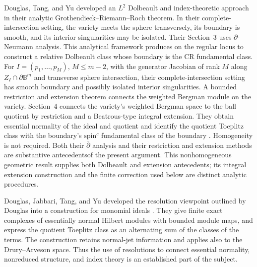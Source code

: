 \documentclass[11pt,reqno]{amsart}
\theoremstyle{remark}
\newcommand{\dbar}{\bar\partial}
\begin{document}
Douglas, Tang, and Yu developed an $L^2$ Dolbeault and index-theoretic
approach in their analytic Grothendieck--Riemann--Roch theorem. In their complete-intersection setting, the
variety meets the sphere transversely, its boundary is smooth, and
its interior singularities may be isolated. Their Section~3 uses $\dbar$-Neumann
analysis.
This analytical framework produces on the regular locus to construct a relative Dolbeault
class whose
boundary is the CR fundamental class. For $I=(p_1,\ldots,p_M)$,
$M\le m-2$, with the generator Jacobian of rank $M$ along
$Z_I\cap\partial\mathbb B^m$ and transverse sphere intersection,
their complete-intersection setting has smooth boundary and possibly
isolated interior singularities. A bounded restriction and extension
theorem connects the weighted Bergman module on the variety. Section~4 connects the variety's weighted Bergman space to
the ball quotient by restriction and a Beatrous-type integral
extension. They obtain essential normality of the ideal and
quotient and identify the quotient
Toeplitz class with the boundary's $\mathrm{spin}^c$ fundamental class
of the boundary \cite[Theorems~1.2, 1.4 and~1.5]{DouglasTangYu}.
Homogeneity is not required. Both their $\dbar$ analysis and their
restriction and
extension methods are substantive antecedentsof the
present argument. This nonhomogeneous geometric result supplies both Dolbeault and
extension antecedents; its integral extension construction and the
finite correction used below are distinct analytic procedures.

Douglas, Jabbari, Tang, and Yu developed the resolution viewpoint
outlined by Douglas \cite{DouglasIndex} into a construction for
monomial ideals \cite{DouglasJabbariTangYu}. They give finite exact
complexes of essentially normal Hilbert modules with bounded module
maps, and express the quotient Toeplitz class as an alternating sum
of the classes of the terms. The construction retains normal-jet
information and applies also to the Drury--Arveson space. Thus the
use of resolutions to connect essential normality, nonreduced
structure, and index theory is an established part of the subject.
\end{document}
